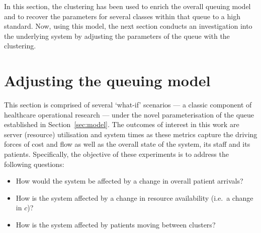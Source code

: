 \documentclass[11pt]{article}
\newlength{\tabwidth}
\begin{document}
\begin{table}
    \centering
    \caption{A comparison of the observed data, and the best and worst simulated
        data based on the model parameters and summary statistics for length of
    stay (LOS).}\label{tab:comparison}
\end{table}

In this section, the clustering has been used to enrich the overall queuing
model and to recover the parameters for several classes within that queue to a
high standard. Now, using this model, the next section conducts an investigation
into the underlying system by adjusting the parameters of the queue with the
clustering.

\section{Adjusting the queuing model}\label{sec:scenarios}

This section is comprised of several `what-if' scenarios --- a classic component
of healthcare operational research --- under the novel parameterisation of the
queue established in Section~\ref{sec:model}. The outcomes of interest in this
work are server (resource) utilisation and system times as these metrics capture
the driving forces of cost and flow as well as the overall state of the system,
its staff and its patients. Specifically, the objective of these experiments is
to address the following questions:
\begin{itemize}
    \item How would the system be affected by a change in overall patient
        arrivals?
    \item How is the system affected by a change in resource availability (i.e.\
        a change in \(c\))?
    \item How is the system affected by patients moving between clusters?
\end{itemize}
\end{document}
